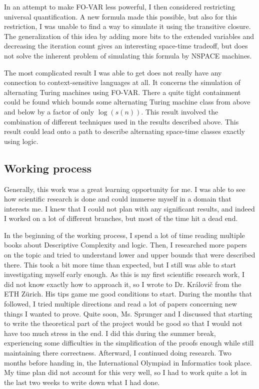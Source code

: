 In an attempt to make FO-VAR less powerful, I then considered restricting universal quantification.
A new formula made this possible, but also for this restriction, I was unable to find a way to simulate it using the transitive closure.
The generalization of this idea by adding more bits to the extended variables and decreasing the iteration count gives an interesting space-time tradeoff, but does not solve the inherent problem of simulating this formula by NSPACE machines.

The most complicated result I was able to get does not really have any connection to context-sensitive languages at all.
It concerns the simulation of alternating Turing machines using FO-VAR\@.
There a quite tight containment could be found which bounds some alternating Turing machine class from above and below by a factor of only $\log(s(n))$.
This result involved the combination of different techniques used in the results described above.
This result could lead onto a path to describe alternating space-time classes exactly using logic.

\subsection{Working process}\label{subsec:working-process}
Generally, this work was a great learning opportunity for me.
I was able to see how scientific research is done and could immerse myself in a domain that interests me.
I knew that I could not plan with any significant results, and indeed I worked on a lot of different branches, but most of the time hit a dead end.

In the beginning of the working process, I spend a lot of time reading multiple books about Descriptive Complexity and logic.
Then, I researched more papers on the topic and tried to understand lower and upper bounds that were described there.
This took a bit more time than expected, but I still was able to start investigating myself early enough.
As this is my first scientific research work, I did not know exactly how to approach it, so I wrote to Dr. Královi\v{c} from the ETH Zürich.
His tips game me good conditions to start.
During the months that followed, I tried multiple directions and read a lot of papers concerning new things I wanted to prove.
Quite soon, Ms. Sprunger and I discussed that starting to write the theoretical part of the project would be good so that I would not have too much stress in the end.
I did this during the summer break, experiencing some difficulties in the simplification of the proofs enough while still maintaining there correctness.
Afterward, I continued doing research.
Two months before handing in, the International Olympiad in Informatics took place.
My time plan did not account for this very well, so I had to work quite a lot in the last two weeks to write down what I had done.

